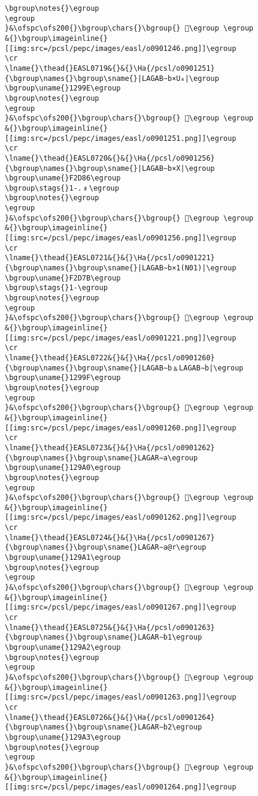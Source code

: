 \begin{verbatim}
\bgroup\notes{}\egroup
\egroup
}&\ofspc\ofs200{}\bgroup\chars{}\bgroup{} 󲶂\egroup \egroup
&{}\bgroup\imageinline{}[[img:src=/pcsl/pepc/images/easl/o0901246.png]]\egroup
\cr
\lname{}\thead{}EASL0719&{}&{}\Ha{/pcsl/o0901251}{\bgroup\names{}\bgroup\sname{}|LAGAB∼b×U₄|\egroup
\bgroup\uname{}1299E\egroup
\bgroup\notes{}\egroup
\egroup
}&\ofspc\ofs200{}\bgroup\chars{}\bgroup{} 𒦞\egroup \egroup
&{}\bgroup\imageinline{}[[img:src=/pcsl/pepc/images/easl/o0901251.png]]\egroup
\cr
\lname{}\thead{}EASL0720&{}&{}\Ha{/pcsl/o0901256}{\bgroup\names{}\bgroup\sname{}|LAGAB∼b×X|\egroup
\bgroup\uname{}F2D86\egroup
\bgroup\stags{}1-.﹟\egroup
\bgroup\notes{}\egroup
\egroup
}&\ofspc\ofs200{}\bgroup\chars{}\bgroup{} 󲶆\egroup \egroup
&{}\bgroup\imageinline{}[[img:src=/pcsl/pepc/images/easl/o0901256.png]]\egroup
\cr
\lname{}\thead{}EASL0721&{}&{}\Ha{/pcsl/o0901221}{\bgroup\names{}\bgroup\sname{}|LAGAB∼b×1(N01)|\egroup
\bgroup\uname{}F2D7B\egroup
\bgroup\stags{}1-\egroup
\bgroup\notes{}\egroup
\egroup
}&\ofspc\ofs200{}\bgroup\chars{}\bgroup{} 󲵻\egroup \egroup
&{}\bgroup\imageinline{}[[img:src=/pcsl/pepc/images/easl/o0901221.png]]\egroup
\cr
\lname{}\thead{}EASL0722&{}&{}\Ha{/pcsl/o0901260}{\bgroup\names{}\bgroup\sname{}|LAGAB∼b﹠LAGAB∼b|\egroup
\bgroup\uname{}1299F\egroup
\bgroup\notes{}\egroup
\egroup
}&\ofspc\ofs200{}\bgroup\chars{}\bgroup{} 𒦟\egroup \egroup
&{}\bgroup\imageinline{}[[img:src=/pcsl/pepc/images/easl/o0901260.png]]\egroup
\cr
\lname{}\thead{}EASL0723&{}&{}\Ha{/pcsl/o0901262}{\bgroup\names{}\bgroup\sname{}LAGAR∼a\egroup
\bgroup\uname{}129A0\egroup
\bgroup\notes{}\egroup
\egroup
}&\ofspc\ofs200{}\bgroup\chars{}\bgroup{} 𒦠\egroup \egroup
&{}\bgroup\imageinline{}[[img:src=/pcsl/pepc/images/easl/o0901262.png]]\egroup
\cr
\lname{}\thead{}EASL0724&{}&{}\Ha{/pcsl/o0901267}{\bgroup\names{}\bgroup\sname{}LAGAR∼a@r\egroup
\bgroup\uname{}129A1\egroup
\bgroup\notes{}\egroup
\egroup
}&\ofspc\ofs200{}\bgroup\chars{}\bgroup{} 𒦡\egroup \egroup
&{}\bgroup\imageinline{}[[img:src=/pcsl/pepc/images/easl/o0901267.png]]\egroup
\cr
\lname{}\thead{}EASL0725&{}&{}\Ha{/pcsl/o0901263}{\bgroup\names{}\bgroup\sname{}LAGAR∼b1\egroup
\bgroup\uname{}129A2\egroup
\bgroup\notes{}\egroup
\egroup
}&\ofspc\ofs200{}\bgroup\chars{}\bgroup{} 𒦢\egroup \egroup
&{}\bgroup\imageinline{}[[img:src=/pcsl/pepc/images/easl/o0901263.png]]\egroup
\cr
\lname{}\thead{}EASL0726&{}&{}\Ha{/pcsl/o0901264}{\bgroup\names{}\bgroup\sname{}LAGAR∼b2\egroup
\bgroup\uname{}129A3\egroup
\bgroup\notes{}\egroup
\egroup
}&\ofspc\ofs200{}\bgroup\chars{}\bgroup{} 𒦣\egroup \egroup
&{}\bgroup\imageinline{}[[img:src=/pcsl/pepc/images/easl/o0901264.png]]\egroup

\end{verbatim}
